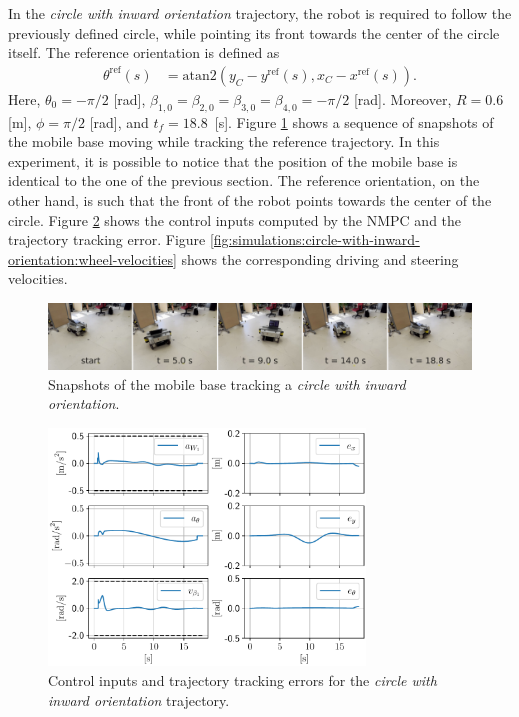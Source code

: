 In the \textit{circle with inward orientation} trajectory, the robot is required
to follow the previously defined circle, while pointing its front towards
the center of the circle itself. The reference orientation is defined as
\begin{subequations}
\begin{align*}
    \theta^{\mathrm{ref}}(s) &= \mathrm{atan2}(y_C - y^{\mathrm{ref}}(s), x_C - x^{\mathrm{ref}}(s)).
\end{align*}
\end{subequations}
Here, $\theta_0=-\pi/2$ [rad], $\beta_{1,0}=\beta_{2,0}=\beta_{3,0}=\beta_{4,0}=-\pi/2$
[rad]. Moreover, $R=0.6$ [m], $\phi=\pi/2$ [rad], and $t_f=18.8$~[s].
Figure \ref{fig:experiments:circle-with-inward-orientation:snapshots} shows a
sequence of snapshots of the mobile base moving while tracking the reference
trajectory. In this experiment, it is possible to notice that the position of
the mobile base is identical to the one of the previous section.
The reference orientation, on the other hand, is such that the front of the
robot points towards the center of the circle.
Figure \ref{fig:simulations:circle-with-inward-orientation:inputs-and-errors}
shows the control inputs computed by the NMPC and the trajectory tracking error.
Figure \ref{fig:simulations:circle-with-inward-orientation:wheel-velocities}
shows the corresponding driving and steering velocities. 
\begin{figure}
    \centering
    \includegraphics[width=\textwidth]{figures/SWMR/simulations/circular_with_inward_orientation/snapshots.jpeg}
    \caption{Snapshots of the mobile base tracking a \textit{circle with inward orientation}.}
    \label{fig:experiments:circle-with-inward-orientation:snapshots}
\end{figure}
\begin{figure}
    \centering
    \includegraphics[width=0.75\textwidth]{figures/SWMR/simulations/circular_with_inward_orientation/inputs_and_errors.pdf}
    \caption{Control inputs and trajectory tracking errors for the \textit{circle with inward orientation} trajectory.}
    \label{fig:simulations:circle-with-inward-orientation:inputs-and-errors}
\end{figure}

